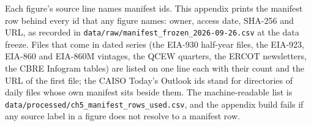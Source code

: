 Each figure's source line names manifest ids. This appendix prints the manifest row behind every id that any figure names: owner, access date, SHA-256 and URL, as recorded in \texttt{data/raw/manifest\_frozen\_2026-09-26.csv} at the data freeze. Files that come in dated series (the EIA-930 half-year files, the EIA-923, EIA-860 and EIA-860M vintages, the QCEW quarters, the ERCOT newsletters, the CBRE Infogram tables) are listed on one line each with their count and the URL of the first file; the CAISO Today's Outlook ids stand for directories of daily files whose own manifest sits beside them. The machine-readable list is \texttt{data/processed/ch5\_manifest\_rows\_used.csv}, and the appendix build fails if any source label in a figure does not resolve to a manifest row.

{\scriptsize}
